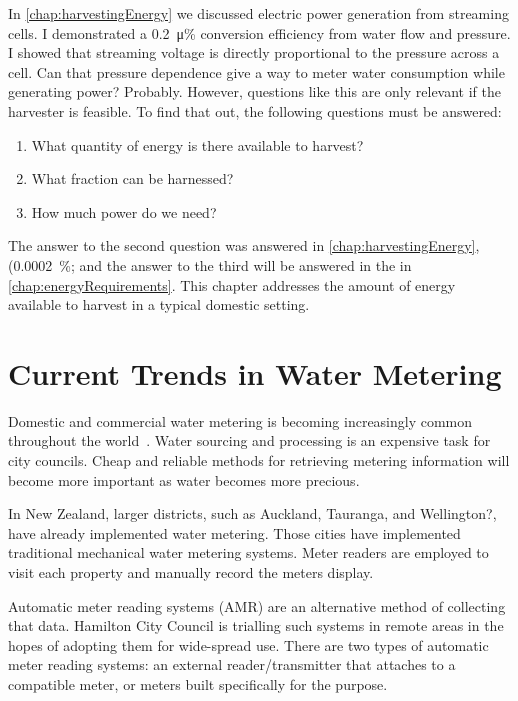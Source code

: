 

In \cref{chap:harvestingEnergy} we discussed electric power generation from streaming cells.
I demonstrated a \SI{0.2}{\micro\percent} conversion efficiency from water flow and pressure.
I showed that streaming voltage is directly proportional to the pressure across a cell.
Can that pressure dependence give a way to meter water consumption while generating power? Probably.
However, questions like this are only relevant if the harvester is feasible.
To find that out, the following questions must be answered:
\begin{enumerate}
  \item What quantity of energy is there available to harvest?
  \item What fraction can be harnessed?
  \item How much power do we need?
\end{enumerate}
The answer to the second question was answered in \cref{chap:harvestingEnergy}, (\SI{0.0002}{\percent}; and the answer to the third will be answered in the in \cref{chap:energyRequirements}.
This chapter addresses the amount of energy available to harvest in a typical domestic setting.


\section{Current Trends in Water Metering}
  Domestic and commercial water metering is becoming increasingly common throughout the world~\cite{Chang2012}.
  Water sourcing and processing is an expensive task for city councils.
  Cheap and reliable methods for retrieving metering information will become more important as water becomes more precious.

  In New Zealand, larger districts, such as Auckland, Tauranga, and Wellington?, have already implemented water metering.
  Those cities have implemented traditional mechanical water metering systems.
  Meter readers are employed to visit each property and manually record the meters display.

  Automatic meter reading systems (AMR) are an alternative method of collecting that data.
  Hamilton City Council is trialling such systems in remote areas in the hopes of adopting them for wide-spread use.
  There are two types of automatic meter reading systems: an external reader/transmitter that attaches to a compatible meter, or meters built specifically for the purpose.

